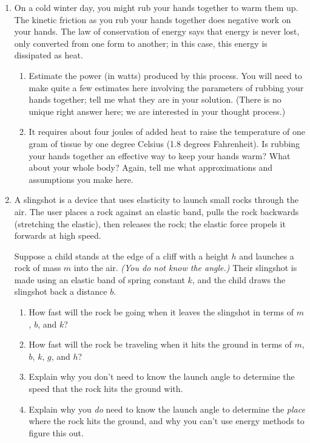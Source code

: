 \documentclass[12pt]{article}
\begin{document}
\begin{enumerate}
{}

\bigskip


\item On a cold winter day, you might rub your hands together to warm them up. The kinetic friction as you rub your hands together does negative work on your hands.
The law of conservation of energy says that energy is never lost, only converted from one form to another; in this case,
this energy is dissipated as heat. 
\begin{enumerate}
\item Estimate the power (in watts) produced by this process. You will need to make quite a few estimates here involving the
parameters of rubbing your hands together; tell me what they are in your solution. (There is no unique right answer here; we are interested in your thought process.)
\item It requires about four joules of added heat to raise the temperature of one gram of tissue by one degree Celsius (1.8 degrees Fahrenheit). 
Is rubbing your hands together an effective way to keep your hands warm?
What about your whole body? Again, tell me what approximations and assumptions you make here. 
\end{enumerate}

\bigskip\newpage

\item A slingshot is a device that uses elasticity to launch small rocks through the air. The user places a rock against an elastic band, pulls the rock backwards (stretching the elastic), then releases the rock; the elastic force propels it forwards at high speed.

Suppose a child stands at the edge of a cliff with a height $h$ and launches a rock of mass $m$ into the air. {\it (You do not know the angle.)} Their slingshot is made using an elastic band of spring constant $k$, and the child draws the slingshot back a distance $b$.

\begin{enumerate} 
	\item How fast will the rock be going when it leaves the slingshot in terms of $m$, $b$, and $k$?
	\item How fast will the rock be traveling when it hits the ground in terms of $m$, $b$, $k$, $g$, and $h$?
	\item Explain why you don't need to know the launch angle to determine the speed that the rock hits the ground with.
	\item Explain why you {\it do} need to know the launch angle to determine the {\it place} where the rock hits the ground, and why you can't use energy methods to figure this out.
\end{enumerate}




\end{enumerate}
\end{document}
